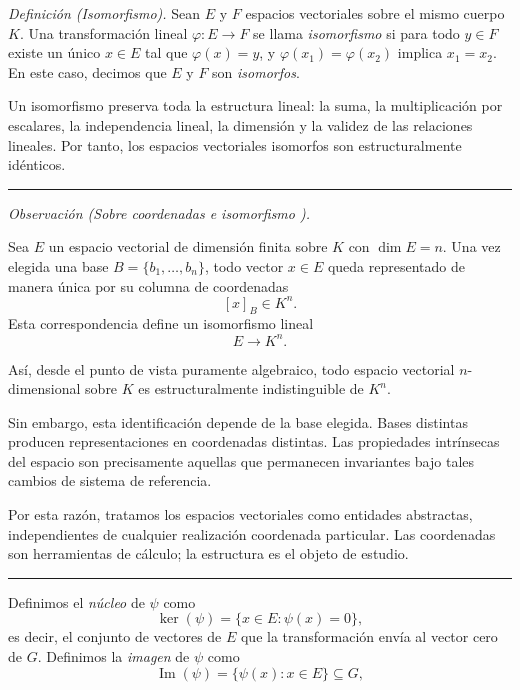 \medskip

\textit{Definición (Isomorfismo).}
Sean $E$ y $F$ espacios vectoriales sobre el mismo cuerpo $K$.
Una transformación lineal $\varphi : E \to F$ se llama \emph{isomorfismo}
si para todo $y \in F$ existe un único $x \in E$ tal que $\varphi(x) = y$,
y $\varphi(x_1) = \varphi(x_2)$ implica $x_1 = x_2$.
En este caso, decimos que $E$ y $F$ son \emph{isomorfos}.

\medskip

Un isomorfismo preserva toda la estructura lineal:
la suma, la multiplicación por escalares, la independencia lineal, la dimensión
y la validez de las relaciones lineales.
Por tanto, los espacios vectoriales isomorfos son estructuralmente idénticos.

\bigskip
\hrule
\medskip


\textit{Observación (Sobre coordenadas e isomorfismo \cite{halmos}).}

Sea $E$ un espacio vectorial de dimensión finita sobre $K$ con $\dim E = n$.
Una vez elegida una base $B=\{b_1,\dots,b_n\}$, todo vector $x\in E$
queda representado de manera única por su columna de coordenadas
\[
[x]_B \in K^n.
\]
Esta correspondencia define un isomorfismo lineal
\[
E \longrightarrow K^n.
\]

\medskip

Así, desde el punto de vista puramente algebraico, todo espacio vectorial
$n$-dimensional sobre $K$ es estructuralmente indistinguible de $K^n$.

\medskip

Sin embargo, esta identificación depende de la base elegida.
Bases distintas producen representaciones en coordenadas distintas.
Las propiedades intrínsecas del espacio son precisamente aquellas
que permanecen invariantes bajo tales cambios de sistema de referencia.

\medskip

Por esta razón, tratamos los espacios vectoriales como entidades abstractas,
independientes de cualquier realización coordenada particular.
Las coordenadas son herramientas de cálculo; la estructura es el objeto de estudio.

\medskip
\hrule
\bigskip

Definimos el \emph{núcleo} de $\psi$ como
\[
    \ker(\psi)=\{x\in E:\psi(x)=0\},
\]
es decir, el conjunto de vectores de $E$ que la transformación envía al vector cero de $G$. Definimos la \emph{imagen} de $\psi$ como
\[
\operatorname{Im}(\psi)=\{\psi(x):x\in E\}\subseteq G,
\]

